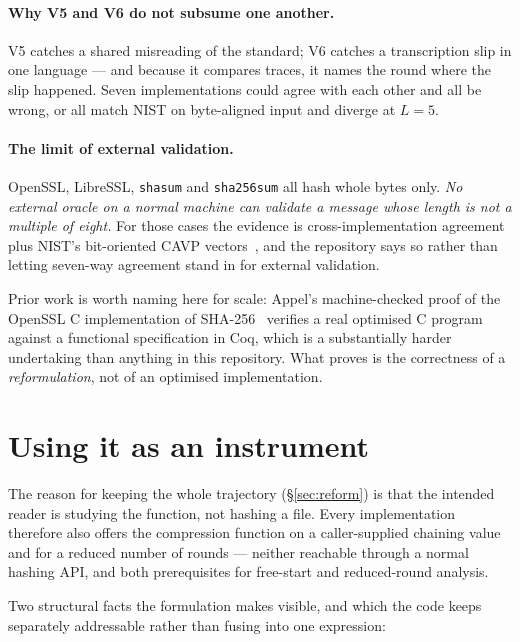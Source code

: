 \documentclass[11pt,a4paper]{article}
\newcommand{\code}[1]{\texttt{#1}}
\begin{document}
\paragraph{Why V5 and V6 do not subsume one another.}
V5 catches a shared misreading of the standard; V6 catches a transcription
slip in one language --- and because it compares traces, it names the round
where the slip happened. Seven implementations could agree with each other and
all be wrong, or all match NIST on byte-aligned input and diverge at $L = 5$.

\paragraph{The limit of external validation.}
OpenSSL, LibreSSL, \code{shasum} and \code{sha256sum} all hash whole bytes
only. \emph{No external oracle on a normal machine can validate a message
whose length is not a multiple of eight.} For those cases the evidence is
cross-implementation agreement plus NIST's bit-oriented CAVP
vectors~\cite{nistcavp}, and the repository says so rather than letting
seven-way agreement stand in for external validation.

Prior work is worth naming here for scale: Appel's machine-checked proof of
the OpenSSL C implementation of SHA-256~\cite{appel2015sha} verifies a real
optimised C program against a functional specification in Coq, which is a
substantially harder undertaking than anything in this repository. What
 proves is the correctness of a \emph{reformulation}, not of an
optimised implementation.

\section{Using it as an instrument}

The reason for keeping the whole trajectory (\S\ref{sec:reform}) is that the
intended reader is studying the function, not hashing a file. Every
implementation therefore also offers the compression function on a
caller-supplied chaining value and for a reduced number of rounds --- neither
reachable through a normal hashing API, and both prerequisites for free-start
and reduced-round analysis.

Two structural facts the formulation makes visible, and which the code keeps
separately addressable rather than fusing into one expression:
\end{document}
